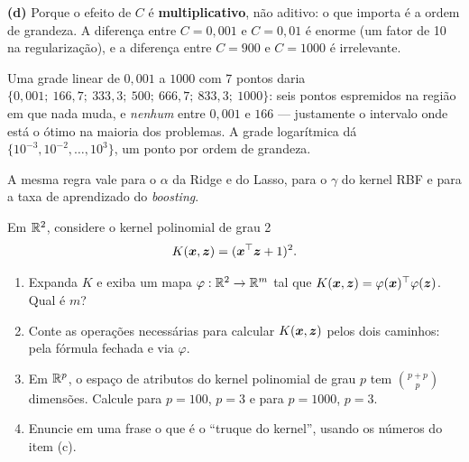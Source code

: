 \documentclass[11pt,a4paper]{article}
\begin{document}
\begin{solucao}
\smallskip
\textbf{(d)} Porque o efeito de $C$ é \textbf{multiplicativo}, não aditivo: o que
importa é a ordem de grandeza. A diferença entre $C=0{,}001$ e $C=0{,}01$ é
enorme (um fator de 10 na regularização), e a diferença entre $C=900$ e
$C=1000$ é irrelevante.

Uma grade linear de $0{,}001$ a $1000$ com 7 pontos daria
$\{0{,}001;\ 166{,}7;\ 333{,}3;\ 500;\ 666{,}7;\ 833{,}3;\ 1000\}$: seis pontos
espremidos na região em que nada muda, e \emph{nenhum} entre $0{,}001$ e $166$ ---
justamente o intervalo onde está o ótimo na maioria dos problemas. A grade
logarítmica dá $\{10^{-3},10^{-2},\dots,10^{3}\}$, um ponto por ordem de
grandeza.

A mesma regra vale para o $\alpha$ da Ridge e do Lasso, para o $\gamma$ do kernel
RBF e para a taxa de aprendizado do \emph{boosting}.
\end{solucao}

\begin{exercicio}
Em $\mathbb{R}^2$, considere o kernel polinomial de grau 2
\[
  K(\bm{x},\bm z) = (\bm{x}^\top\bm z + 1)^2 .
\]
\begin{enumerate}[label=(\alph*),leftmargin=1.1cm]
  \item Expanda $K$ e exiba um mapa $\varphi:\mathbb{R}^2\to\mathbb{R}^m$ tal que
        $K(\bm{x},\bm z)=\varphi(\bm{x})^\top\varphi(\bm z)$. Qual é $m$?
  \item Conte as operações necessárias para calcular $K(\bm{x},\bm z)$ pelos dois
        caminhos: pela fórmula fechada e via $\varphi$.
  \item Em $\mathbb{R}^p$, o espaço de atributos do kernel polinomial de grau $p$ tem
        $\binom{p+p}{p}$ dimensões. Calcule para $p=100$, $p=3$ e para
        $p=1000$, $p=3$.
  \item Enuncie em uma frase o que é o ``truque do kernel'', usando os números
        do item (c).
\end{enumerate}
\end{exercicio}
\end{document}

